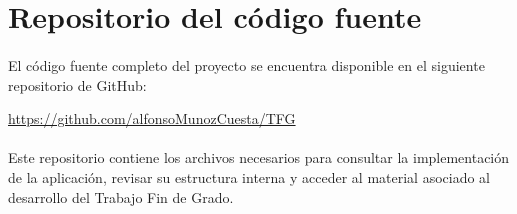 % 

\section{Repositorio del código fuente}

\paragraph*{}El código fuente completo del proyecto se encuentra disponible en el siguiente repositorio de GitHub:

\begin{center}
\url{https://github.com/alfonsoMunozCuesta/TFG}
\end{center}

\paragraph*{}Este repositorio contiene los archivos necesarios para consultar la implementación de la aplicación, revisar su estructura interna y acceder al material asociado al desarrollo del Trabajo Fin de Grado.
